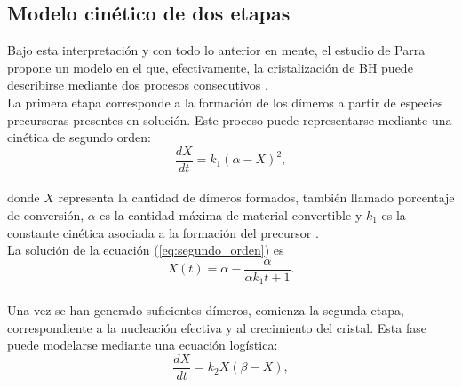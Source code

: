 \documentclass[12pt,letterpaper,oneside]{report}
\begin{document}


\subsection{Modelo cinético de dos etapas}

Bajo esta interpretación y con todo lo anterior en mente, el estudio de Parra propone un modelo en el que, efectivamente, la cristalización de BH puede describirse mediante dos procesos consecutivos \cite{AlirioParra2023}.\\

La primera etapa corresponde a la formación de los dímeros a partir de especies precursoras presentes en solución. Este proceso puede representarse mediante una cinética de segundo orden:\\

\begin{equation}
\frac{dX}{dt}
=
k_{1}
(\alpha-X)^{2},
\label{eq:segundo_orden}
\end{equation}\\

\noindent donde $X$ representa la cantidad de dímeros formados, también llamado porcentaje de conversión, $\alpha$ es la cantidad máxima de material convertible y $k_{1}$ es la constante cinética asociada a la formación del precursor \cite{AlirioParra2023}.\\

La solución de la ecuación (\ref{eq:segundo_orden}) es\\

\begin{equation}
X(t)
=
\alpha
-
\frac{\alpha}
{\alpha k_{1} t +1}.
\label{eq:sol_segundo_orden}
\end{equation}\\

Una vez se han generado suficientes dímeros, comienza la segunda etapa, correspondiente a la nucleación efectiva y al crecimiento del cristal. Esta fase puede modelarse mediante una ecuación logística:\\

\begin{equation}
\frac{dX}{dt}
=
k_{2}
X(\beta-X),
\label{eq:logistica}
\end{equation}\\
\end{document}
